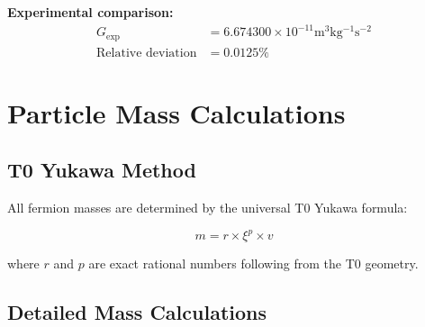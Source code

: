 	\textbf{Experimental comparison:}
	\begin{align}
		G_{\text{exp}} &= 6.674300 \times 10^{-11} \si{\meter^3 \kilogram^{-1} \second^{-2}} \\
		\text{Relative deviation} &= 0.0125\%
	\end{align}
	
	\section{Particle Mass Calculations}
	
	\subsection{T0 Yukawa Method}
	
	All fermion masses are determined by the universal T0 Yukawa formula:
	
	\begin{equation}
		\boxed{m = r \times \xi^p \times v}
	\end{equation}
	
	where $r$ and $p$ are exact rational numbers following from the T0 geometry.
	
	\subsection{Detailed Mass Calculations}
	
